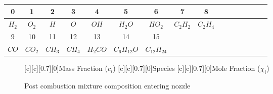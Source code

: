 \begin{table}[!h]
\begin{center}
\begin{threeparttable}


\begin{tabular}{cccccccccccccccc}
\toprule
0 & 1 & 2 & 3 & 4 & 5 & 6 & 7 & 8\\
\midrule
$H_2$ & $O_2$ & $H$ & $O$ & $OH$ & $H_2O$ & $HO_2$ & $C_2H_2$ & $C_2H_4$\\ 

\midrule
9 & 10 & 11 & 12 & 13 & 14 & 15 & \\
\midrule
$CO$ & $CO_2$ & $CH_3$ & $CH_4$ & $H_2CO$ & $C_6H_{12}O$ & $C_{12}H_{24}$ & \\
\bottomrule
\end{tabular}


\label{table:speciesmap}
\end{threeparttable}
\end{center}
\end{table}

\begin{figure}[!h]
\begin{center}
[c][c][0.7][0]{Mass Fraction ($c_i$)}
[c][c][0.7][0]{Species}
[c][c][0.7][0]{Mole Fraction ($\chi_i$)}

\caption{Post combustion mixture composition entering nozzle}
\label{fig:mixcomp}
\end{center}
\end{figure}  

